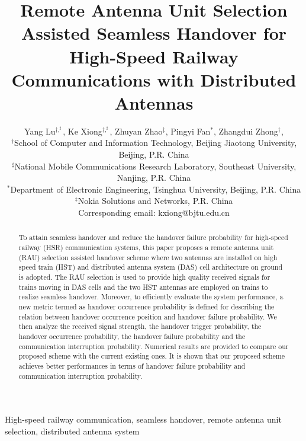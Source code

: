 \documentclass[a4paper,twocolumn,10pt]{IEEEtran}
\begin{document}
\title{Remote Antenna Unit Selection Assisted Seamless Handover for High-Speed Railway Communications with Distributed Antennas}

\author{Yang Lu$^{\dagger,^\sharp}$, Ke Xiong$^{\dagger,^\sharp}$, Zhuyan Zhao$^{\ddag}$, Pingyi Fan$^{\ast}$, Zhangdui Zhong$^{\dagger}$,
\\
\small
$^\dag$School of Computer and Information Technology, Beijing Jiaotong University, Beijing, P.R. China\\
$^\sharp$National Mobile Communications
Research Laboratory, Southeast University, Nanjing, P.R. China\\
$^\ast$Department of Electronic Engineering, Tsinghua University, Beijing, P.R. China\\
$^\ddag$Nokia Solutions and Networks, P.R. China\\
Corresponding email: kxiong@bjtu.edu.cn}


\maketitle

\begin{abstract}
To attain seamless handover and reduce the handover failure probability for high-speed railway (HSR) communication systems, this paper proposes a remote antenna unit (RAU) selection assisted handover scheme where two  antennas are installed on high speed train (HST) and distributed antenna system (DAS) cell architecture on ground is adopted. The RAU selection is used to provide high quality received signals for trains moving in DAS cells and the two HST antennas are employed on trains to realize seamless handover. Moreover, to efficiently evaluate the system performance, a new metric termed as handover occurrence probability is defined for describing  the relation between handover occurrence position and handover failure probability. We then analyze the received signal strength, the handover trigger probability, the handover occurrence probability, the handover failure probability and the communication interruption probability. Numerical results are provided to compare our proposed scheme with the current existing  ones. It is shown that our proposed scheme achieves better performances in terms of handover failure probability and communication interruption probability.
\end{abstract}

\begin{IEEEkeywords}
High-speed railway communication, seamless handover, remote antenna unit selection, distributed antenna system
\end{IEEEkeywords}
\end{document}
